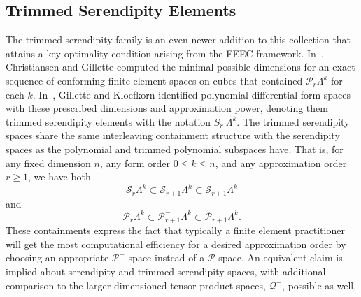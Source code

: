 \documentclass[format=acmsmall,screen,timestamp=false,a4paper]{acmart}
\DeclareMathOperator{\Div}{div}
\DeclareMathOperator{\curl}{curl}
\newcommand{\calP}{\mathcal{P}}
\newcommand{\calQ}{\mathcal{Q}}
\newcommand{\calS}{\mathcal{S}}
\newcommand{\hcurl}{\ensuremath{{H}(\curl ) } }
\newcommand{\hdiv}{\ensuremath{{H}(\Div ) } }
\begin{document}
\begin{table}[htbp]
\label{tab:tsfamily}
\end{table}


 
 
    
\subsection{Trimmed Serendipity Elements}
    The trimmed serendipity family is an even newer addition to this collection that attains a key optimality condition arising from the FEEC framework.
	In~\cite{christiansen2016constructions}, Christiansen and Gillette computed the minimal possible dimensions for an exact sequence of conforming finite element spaces on cubes that contained $\calP_r\Lambda^k$ for each $k$.
	In~\cite{gillette2019trimmed}, Gillette and Kloefkorn identified polynomial differential form spaces with these prescribed dimensions and approximation power, denoting them trimmed serendipity elements with the notation $S^-_r\Lambda^k$.  
	The trimmed serendipity spaces share the same interleaving containment structure with the serendipity spaces as the polynomial and trimmed polynomial subspaces have.  That is, for any fixed dimension $n$, any form order $0\leq k\leq n$, and any approximation order $r\geq 1$, we have both
\begin{equation*}
      \calS_r \Lambda^k \subset \calS^-_{r+1} \Lambda^k \subset \calS_{r+1} \Lambda^k
  \end{equation*}
  and   
   \begin{equation*}
      \calP_r \Lambda^k \subset \calP^-_{r+1} \Lambda^k \subset \calP_{r+1} \Lambda^k.
  \end{equation*}
	These containments express the fact that typically a finite element practitioner will get the most computational efficiency for a desired approximation order by choosing an appropriate $\calP^-$ space instead of a $\calP$ space.
	An equivalent claim is implied about serendipity and trimmed serendipity spaces, with additional comparison to the larger dimensioned tensor product spaces, $\calQ^-$, possible as well.
\end{document}
